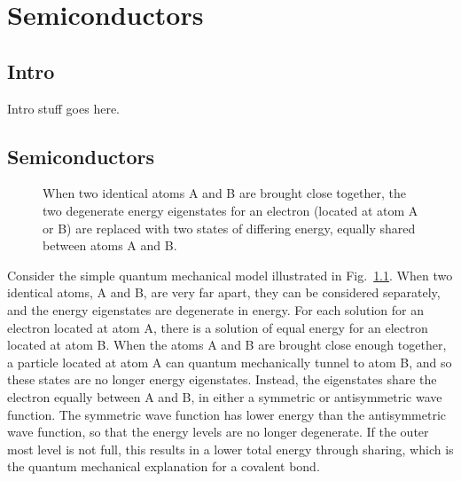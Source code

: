 
\chapter{Semiconductors}

\section{Intro}
Intro stuff goes here.

\section{Semiconductors}

\begin{figure}[htbp]
\begin{center}
\caption{When two identical atoms A and B are brought close together, the two degenerate energy eigenstates for an electron (located at atom A or B) are replaced with two states of differing energy, equally shared between atoms A and B.}
\label{fig:bond}
\end{center}
\end{figure}

Consider the simple quantum mechanical model illustrated in Fig.~\ref{fig:bond}.  When two identical atoms, A and B, are very far apart, they can be considered separately, and the energy eigenstates are degenerate in energy.  For each solution for an electron located at atom A, there is a solution of equal energy for an electron located at atom B.  When the atoms A and B are brought close enough together, a particle located at atom A can quantum mechanically tunnel to atom B, and so these states are no longer energy eigenstates.  Instead, the eigenstates share the electron equally between A and B, in either a symmetric or antisymmetric wave function.  The symmetric wave function has lower energy than the antisymmetric wave function, so that the energy levels are no longer degenerate.  If the outer most level is not full, this results in a lower total energy through sharing, which is the quantum mechanical explanation for a covalent bond.

